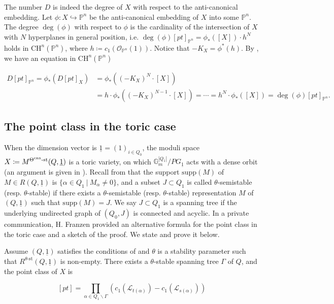 \documentclass[11pt]{article}
\begin{document}
The number \(D\) is indeed the degree of \(X\) with respect to the anti-canonical embedding. Let \(\phi:X\hookrightarrow \mathbb{P}^n\) be the anti-canonical embedding of \(X\) into some \(\mathbb{P}^n\). The degree \(\deg(\phi)\) with respect to \(\phi\) is the cardinality of the intersection of \(X\) with \(N\) hyperplanes in general position, i.e. \(\deg(\phi)[pt]_{\mathbb{P}^n} = \phi_*([X])\cdot h^N\) holds in \(\mathrm{CH}^{n}(\mathbb{P}^n)\), where \(h\coloneqq c_1(\mathcal{O}_{\mathbb{P}^n}(1))\). Notice that \(-K_X = \phi^*(h)\). By \cite[Proposition 2.5(c)]{Fulton98}, we have an equation in $\mathrm{CH}^n(\mathbb{P}^n)$

\begin{align*}
    D[pt]_{\mathbb{P}^n} = \phi_*(D[pt]_X) &= \phi_*((-K_X)^N\cdot [X]) \\ 
    &= h\cdot \phi_*((-K_X)^{N-1}\cdot [X]) = \cdots  = h^N\cdot \phi_*([X]) = \deg(\phi)[pt]_{\mathbb{P}^n}.
\end{align*}

\subsection{The point class in the toric case}

When the dimension vector is \(\underline{1} = (1)_{i\in Q_0}\), the moduli space \(X \coloneqq M^{\Theta^{\text{can}}\text{-st}}(Q, \underline{1})\) is a toric variety, on which \(\mathbb{G}_m^{|Q_1|} / PG_{\underline{1}}\) acts with a dense orbit (an argument is given in \cite[Section 4.1]{franzen2015chow}). Recall from \cite{franzen2015chow} that the support \(\text{supp}(M)\) of \(M\in R(Q, \underline{1})\) is \(\{\alpha\in Q_1~|~M_{\alpha}\neq 0\}\), and a subset \(J\subset Q_1\) is called \(\theta\)-semistable (resp. \(\theta\)-stable) if there exists a \(\theta\)-semistable (resp. \(\theta\)-stable) representation \(M\) of \((Q, \underline{1})\) such that \(\text{supp}(M) = J\). We say \(J\subset Q_1\) is a spanning tree if the underlying undirected graph of \((Q_0, J)\) is connected and acyclic. In a private communication, H. Franzen provided an alternative formula for the point class in the toric case and a sketch of the proof. We state and prove it below. 

\begin{theorem}\label{Theorem:point-class-via-spanning-tree}
    Assume \((Q, \underline{1})\) satisfies the conditions of  and \(\theta\) is a stability parameter such that \(R^{\theta\text{-st}}(Q, \underline{1})\) is non-empty. There exists a \(\theta\)-stable spanning tree \(\Gamma\) of \(Q\), and the point class of \(X\) is 

    \begin{equation}\label{Equation:toric-pt}
        [pt] = \prod_{\alpha\in Q_1\backslash \Gamma}(c_1(\mathcal{L}_{t(\alpha)}) - c_1(\mathcal{L}_{s(\alpha)}))
    \end{equation}
\end{theorem}
\end{document}
